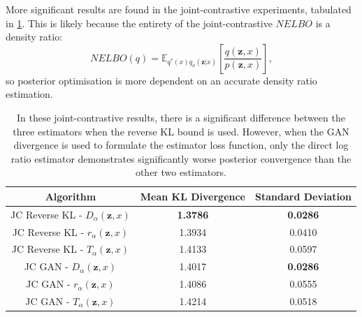 \documentclass[honours,12pt]{unswthesis}
\newcommand{\E}{\mathbb{E}}
\numberwithin{equation}{section}
\theoremstyle{definition}
\begin{document}
\newpage
More significant results are found in the joint-contrastive experiments, tabulated in \ref{tab:7.2}. This is likely because the entirety of the joint-contrastive $NELBO$ is a density ratio: \[NELBO(q)=\E_{q^*(x)q_\phi(\bm{z}|x)}\left[\frac{q(\bm{z},x)}{p(\bm{z},x)}\right],\] so posterior optimisation is more dependent on an accurate density ratio estimation.
\begin{table}[h]
\centering
\begin{tabular}{|c|c|c|}
\hline
Algorithm & Mean KL Divergence & Standard Deviation\\
\hline
JC Reverse KL - $D_\alpha(\bm{z},x)$ & \textbf{1.3786} & \textbf{0.0286}\\
\hline
JC Reverse KL - $r_\alpha(\bm{z},x)$ & 1.3934 & 0.0410\\
\hline
JC Reverse KL - $T_\alpha(\bm{z},x)$ & 1.4133 & 0.0597\\
\hline
JC GAN - $D_\alpha(\bm{z},x)$ & 1.4017 & \textbf{0.0286}\\
\hline
JC GAN - $r_\alpha(\bm{z},x)$ & 1.4086 & 0.0555\\
\hline
JC GAN - $T_\alpha(\bm{z},x)$ & 1.4214 & 0.0518\\
\hline
\end{tabular}
\caption{\small In these joint-contrastive results, there is a significant difference between the three estimators when the reverse KL bound is used. However, when the GAN divergence is used to formulate the estimator loss function, only the direct log ratio estimator demonstrates significantly worse posterior convergence than the other two estimators.}
\label{tab:7.2}
\end{table}
\end{document}

